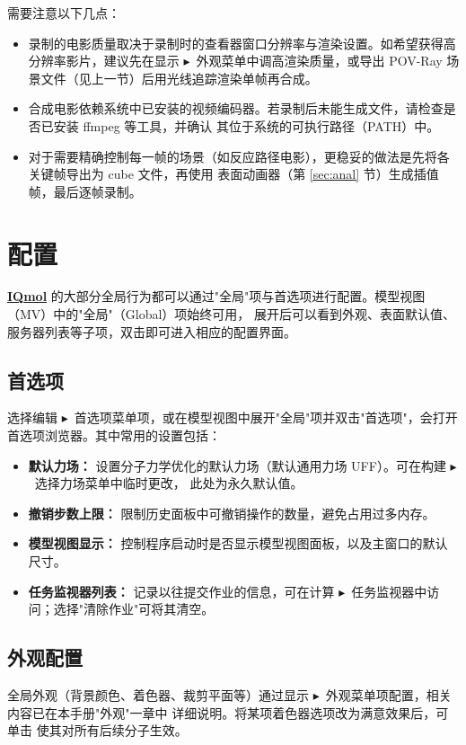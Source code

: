 \documentclass[a4paper,12pt]{ctexart}
\newcommand{\iqmol}{\href{https://www.iqmol.org}{\textbf{IQmol}}}
\newcommand{\bt}{\ensuremath{\blacktriangleright}}
\begin{document}
需要注意以下几点：
\begin{itemize}
\item 录制的电影质量取决于录制时的查看器窗口分辨率与渲染设置。如希望获得高分辨率影片，建议先在显示 \bt\
      外观菜单中调高渲染质量，或导出 POV-Ray 场景文件（见上一节）后用光线追踪渲染单帧再合成。
\item 合成电影依赖系统中已安装的视频编码器。若录制后未能生成文件，请检查是否已安装 ffmpeg 等工具，并确认
      其位于系统的可执行路径（PATH）中。
\item 对于需要精确控制每一帧的场景（如反应路径电影），更稳妥的做法是先将各关键帧导出为 cube 文件，再使用
      表面动画器（第 \ref{sec:anal} 节）生成插值帧，最后逐帧录制。
\end{itemize}


\section{配置}
\label{sec:config}

\iqmol{} 的大部分全局行为都可以通过"全局"项与首选项进行配置。模型视图（MV）中的"全局"（Global）项始终可用，
展开后可以看到外观、表面默认值、服务器列表等子项，双击即可进入相应的配置界面。

\subsection*{首选项}

选择编辑 \bt\ 首选项菜单项，或在模型视图中展开"全局"项并双击"首选项"，会打开首选项浏览器。其中常用的设置包括：

\begin{itemize}
\item {\bf 默认力场：} 设置分子力学优化的默认力场（默认通用力场 UFF）。可在构建 \bt\ 选择力场菜单中临时更改，
      此处为永久默认值。
\item {\bf 撤销步数上限：} 限制历史面板中可撤销操作的数量，避免占用过多内存。
\item {\bf 模型视图显示：} 控制程序启动时是否显示模型视图面板，以及主窗口的默认尺寸。
\item {\bf 任务监视器列表：} 记录以往提交作业的信息，可在计算 \bt\ 任务监视器中访问；选择"清除作业"可将其清空。
\end{itemize}

\subsection*{外观配置}

全局外观（背景颜色、着色器、裁剪平面等）通过显示 \bt\ 外观菜单项配置，相关内容已在本手册"外观"一章中
详细说明。将某项着色器选项改为满意效果后，可单击  使其对所有后续分子生效。
\end{document}
